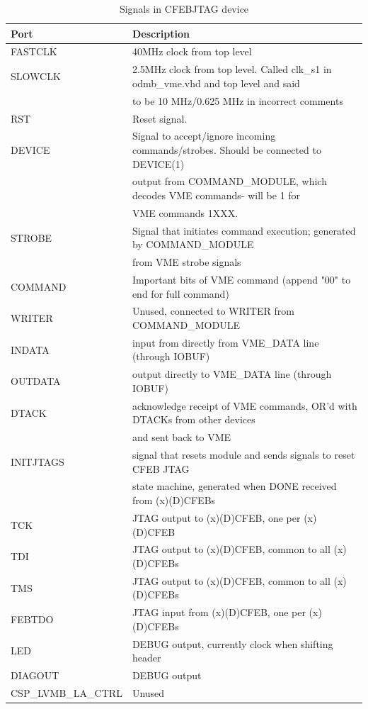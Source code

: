 \documentclass[10pt,a4paper]{article}
\begin{document}
\begin{table}[H]
\begin{tabular}{|l|l|} \hline
Port& Description\\ \hline
FASTCLK& 40MHz clock from top level\\ \hline
SLOWCLK& 2.5MHz clock from top level. Called clk\_s1 in odmb\_vme.vhd and top level and said \\
       &to be 10 MHz/0.625 MHz in incorrect comments\\ \hline
RST& Reset signal.\\ \hline
DEVICE& Signal to accept/ignore incoming commands/strobes. Should be connected to DEVICE(1) \\
      & output from COMMAND\_MODULE, which decodes VME commands- will be 1 for \\
			& VME commands 1XXX.\\ \hline 
STROBE& Signal that initiates command execution; generated by COMMAND\_MODULE \\
      & from VME strobe signals\\ \hline
COMMAND& Important bits of VME command (append "00" to end for full command)\\ \hline
WRITER& Unused, connected to WRITER from COMMAND\_MODULE\\ \hline
INDATA& input from directly from VME\_DATA line (through IOBUF)\\ \hline
OUTDATA& output directly to VME\_DATA line (through IOBUF)\\ \hline
DTACK& acknowledge receipt of VME commands, OR'd with DTACKs from other devices \\
     & and sent back to VME\\ \hline
INITJTAGS& signal that resets module and sends signals to reset CFEB JTAG \\
         & state machine, generated when DONE received from (x)(D)CFEBs\\ \hline
TCK& JTAG output to (x)(D)CFEB, one per (x)(D)CFEB\\ \hline
TDI& JTAG output to (x)(D)CFEB, common to all (x)(D)CFEBs\\ \hline
TMS& JTAG output to (x)(D)CFEB, common to all (x)(D)CFEBs\\ \hline
FEBTDO& JTAG input from (x)(D)CFEB, one per (x)(D)CFEBs\\ \hline
LED& DEBUG output, currently clock when shifting header\\ \hline
DIAGOUT& DEBUG output\\ \hline
CSP\_LVMB\_LA\_CTRL& Unused\\ \hline
\end{tabular}
\caption{Signals in CFEBJTAG device}
\label{tab:cfebjtaginterface}
\end{table}
\end{document}
